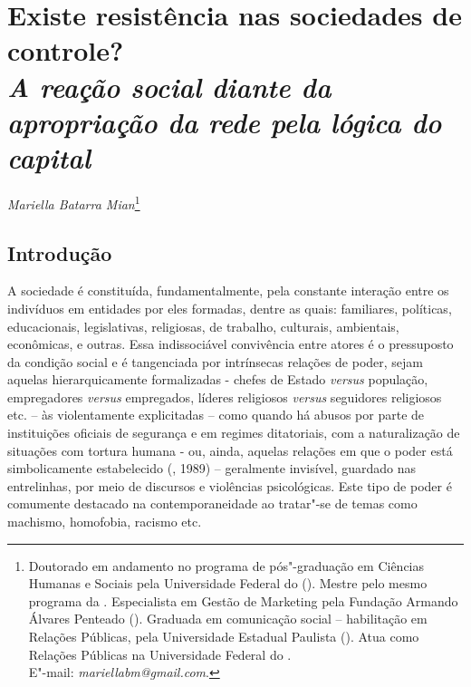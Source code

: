 \chapter*{Existe resistência nas sociedades de controle?\\ \emph{\small{A reação social diante da apropriação da rede pela lógica do capital}}}


\begin{flushright}
\emph{Mariella Batarra Mian}\footnote{Doutorado em andamento no programa de
  pós"-graduação em Ciências Humanas e Sociais pela Universidade Federal
  do  (). Mestre pelo mesmo programa da . Especialista em
  Gestão de Marketing pela Fundação Armando Álvares Penteado ().
  Graduada em comunicação social -- habilitação em Relações Públicas,
  pela Universidade Estadual Paulista (). Atua como Relações
  Públicas na Universidade Federal do .\\
  E"-mail: \emph{mariellabm@gmail.com}.}
\end{flushright}

\section{Introdução}

A sociedade é constituída, fundamentalmente, pela constante interação
entre os indivíduos em entidades por eles formadas, dentre as quais:
familiares, políticas, educacionais, legislativas, religiosas, de
trabalho, culturais, ambientais, econômicas, e outras. Essa
indissociável convivência entre atores é o pressuposto da condição
social e é tangenciada por intrínsecas relações de poder, sejam aquelas
hierarquicamente formalizadas - chefes de Estado \emph{versus}
população, empregadores \emph{versus} empregados, líderes religiosos
\emph{versus} seguidores religiosos etc. -- às violentamente
explicitadas -- como quando há abusos por parte de instituições oficiais
de segurança e em regimes ditatoriais, com a naturalização de situações
com tortura humana - ou, ainda, aquelas relações em que o poder está
simbolicamente estabelecido (, 1989) -- geralmente invisível,
guardado nas entrelinhas, por meio de discursos e violências
psicológicas. Este tipo de poder é comumente destacado na
contemporaneidade ao tratar"-se de temas como machismo, homofobia,
racismo etc.

